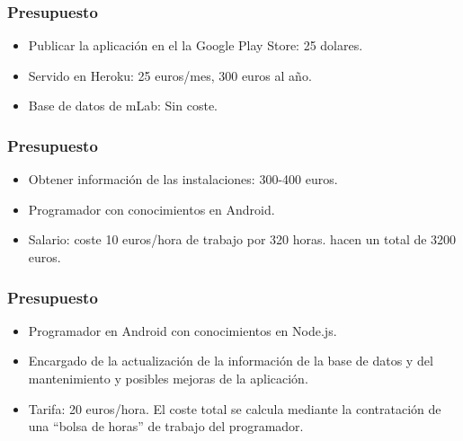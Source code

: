 \begin{frame}
	\frametitle{Presupuesto}
		\begin{itemize}
			\item Publicar la aplicación en el la Google Play Store: 25 dolares.
			\item Servido en Heroku: 25 euros/mes, 300 euros al año.
			\item Base de datos de mLab: Sin coste.
		\end{itemize}
	\endblock{}
\end{frame}

\begin{frame}
	\frametitle{Presupuesto}
		\begin{itemize}
			\item Obtener información de las instalaciones: 300-400 euros.
			\item Programador con conocimientos en Android.
			\item Salario: coste 10 euros/hora de trabajo por 320 horas. hacen un total de 3200 euros.
		\end{itemize}
	\endblock{}
\end{frame}


\begin{frame}
	\frametitle{Presupuesto}
		\begin{itemize}
			\item Programador en Android con conocimientos en Node.js.
			\item Encargado de la actualización de la información de la base de datos y del mantenimiento y posibles mejoras de la aplicación.
			\item Tarifa: 20 euros/hora. El coste total se calcula mediante la contratación de una ``bolsa de horas'' de trabajo del programador.
		\end{itemize}
	\endblock{}
\end{frame}
